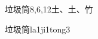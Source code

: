 \begin{entry}{垃圾筒}{8,6,12}{⼟、⼟、⽵}
  \begin{phonetics}{垃圾筒}{la1ji1tong3}
  \end{phonetics}
\end{entry}
